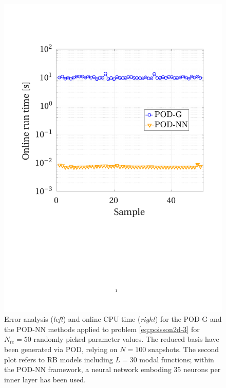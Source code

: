 \documentclass[12pt, a4paper, twoside, openright, notitlepage]{report}
\numberwithin{equation}{chapter}
\theoremstyle{theorem}
\theoremstyle{definition}
\theoremstyle{remark}
\theoremstyle{proposition}
\numberwithin{figure}{chapter}
\begin{document}
\begin{figure}[H]
			\includegraphics[scale = 0.41, trim = {1.5cm 8.9cm 1.5cm 3.8cm}, clip]{poisson2d_3_time}
			
			\caption{Error analysis (\emph{left}) and online CPU time (\emph{right}) for the POD-G and the POD-NN methods applied to problem \eqref{eq:poisson2d-3} for $N_{te} = 50$ randomly picked parameter values. The reduced basis have been generated via POD, relying on $N = 100$ snapshots. The second plot refers to RB models including $L = 30$ modal functions; within the POD-NN framework, a neural network emboding $35$ neurons per inner layer has been used.}
			\label{fig:poisson2d-3-fig2}
		\end{figure}
		
		\vspace*{-0.2cm}
		
\end{document}
